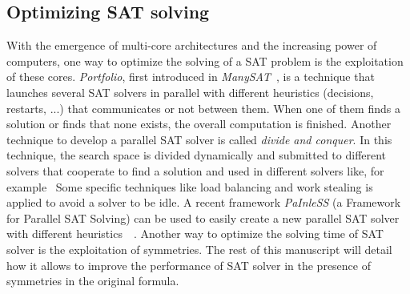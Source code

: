 \subsection{Optimizing SAT solving}
With the emergence of multi-core architectures and the increasing power of computers, one way to optimize the solving
of a SAT problem is the exploitation of these cores. %
\emph{Portfolio}, first introduced in \emph{ManySAT}~\cite{hamadi2008manysat}, is a technique that launches several SAT solvers in parallel with different heuristics (decisions, restarts, ...) that 
communicates or not between them. When one of them finds a solution or finds that none exists, the overall computation is finished.
Another technique to develop a parallel SAT solver is called \emph{divide and conquer}. In this technique,
the search space is divided  dynamically and submitted to different solvers that cooperate to find a solution and used in
different solvers like, for example~\cite{chu2008pminisat, lewis2007multithreaded}
 Some specific techniques like load balancing and work stealing is applied to avoid a solver to be idle.
A recent framework \emph{PaInleSS} (a Framework for Parallel SAT Solving) can be used to easily create a new parallel 
SAT solver with different heuristics~\cite{le2017painless}~\cite{le2019modular}. 
Another way to optimize the solving time of SAT solver is the exploitation of symmetries. The rest of this manuscript will 
detail how it allows to improve the performance of SAT solver in the presence of symmetries in the original formula.
%
